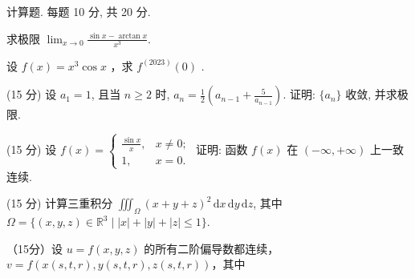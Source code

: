 \par{}
计算题. 每题 10 分, 共 20 分.\par
求极限 $\lim_{x\to 0}\frac{\sin x - \arctan x}{x^3}.$\par
设  $f(x)=x^{3}\cos x$ ，求  $f^{(2023)}(0)$ .\par
\par{}
(15 分) 设 $a_1 = 1$, 且当 $n \geq 2$ 时, $a_n = \frac{1}{2} \left( a_{n-1} + \frac{5}{a_{n-1}} \right)$. 证明: $\{a_n\}$ 收敛, 并求极限.\par
\par{}
(15 分) 设 $f(x) = \begin{cases} \frac{\sin x}{x}, & x \neq 0; \\ 1, & x = 0. \end{cases}$ 证明: 函数 $f(x)$ 在 $(-\infty, +\infty)$ 上一致连续.\par
\par{}
(15 分) 计算三重积分 $\iiint_{\Omega} (x + y + z)^2 \, \mathrm{d}x \, \mathrm{d}y \, \mathrm{d}z$, 其中 $\Omega = \{(x, y, z) \in \mathbb{R}^3 \mid |x| + |y| + |z| \leq 1\}$.\par
\par{}
\par{}
（15分）设 $u = f(x,y,z)$ 的所有二阶偏导数都连续，$v = f(x(s,t,r),y(s,t,r),z(s,t,r))$，其中\par
\nopagebreak[4]
